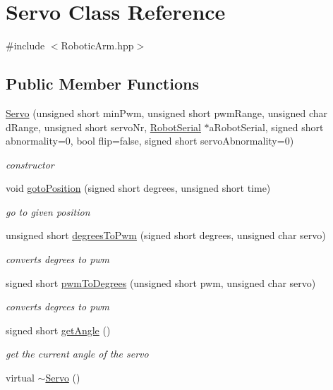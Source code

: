 \hypertarget{struct_servo}{}\section{Servo Class Reference}
\label{struct_servo}


{\ttfamily \#include $<$Robotic\+Arm.\+hpp$>$}

\subsection*{Public Member Functions}
\begin{DoxyCompactItemize}
\item 
\hyperlink{struct_servo_ab662ab5df0c5f665e7eb11508c39f1a7}{Servo} (unsigned short min\+Pwm, unsigned short pwm\+Range, unsigned char d\+Range, unsigned short servo\+Nr, \hyperlink{class_robot_serial}{Robot\+Serial} $\ast$a\+Robot\+Serial, signed short abnormality=0, bool flip=false, signed short servo\+Abnormality=0)
\begin{DoxyCompactList}\small\item\em constructor \end{DoxyCompactList}\item 
void \hyperlink{struct_servo_aed94c74351c407e550a51ba40215c135}{goto\+Position} (signed short degrees, unsigned short time)
\begin{DoxyCompactList}\small\item\em go to given position \end{DoxyCompactList}\item 
unsigned short \hyperlink{struct_servo_a0cfd9bbddac8bb91017569e0812f816a}{degrees\+To\+Pwm} (signed short degrees, unsigned char servo)
\begin{DoxyCompactList}\small\item\em converts degrees to pwm \end{DoxyCompactList}\item 
signed short \hyperlink{struct_servo_a293b3a36b2ab449f83d2c1152a6c5115}{pwm\+To\+Degrees} (unsigned short pwm, unsigned char servo)
\begin{DoxyCompactList}\small\item\em converts degrees to pwm \end{DoxyCompactList}\item 
signed short \hyperlink{struct_servo_af8a34733daf26ac3fe4bc6002931b7a8}{get\+Angle} ()
\begin{DoxyCompactList}\small\item\em get the current angle of the servo \end{DoxyCompactList}\item 
virtual \hyperlink{struct_servo_acb51bf4d970b071741ba76349a431fb0}{$\sim$\+Servo} ()
\end{DoxyCompactItemize}
